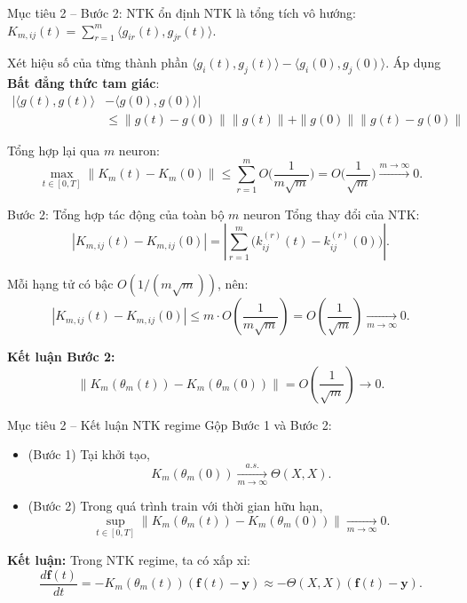 \begin{frame}{Mục tiêu 2 – Bước 2: NTK ổn định}
  NTK là tổng tích vô hướng: $K_{m,ij}(t) = \sum_{r=1}^m \langle g_{ir}(t), g_{jr}(t) \rangle$.

  Xét hiệu số của từng thành phần $\langle g_i(t), g_j(t) \rangle - \langle g_i(0), g_j(0) \rangle$.
  Áp dụng \textbf{Bất đẳng thức tam giác}:
  \[
    \begin{aligned}
      |\langle g(t), g(t) \rangle &- \langle g(0), g(0) \rangle| \\
      &\le \|g(t)-g(0)\|\|g(t)\| + \|g(0)\|\|g(t)-g(0)\|
    \end{aligned}
  \]
  
  Tổng hợp lại qua $m$ neuron:
  \[
    \max_{t \in [0,T]} \|K_m(t) - K_m(0)\| \le \sum_{r=1}^m O\Big(\frac{1}{m\sqrt{m}}\Big) = O\Big(\frac{1}{\sqrt{m}}\Big) \xrightarrow{m \to \infty} 0.
  \]

\end{frame}

\begin{frame}{Bước 2: Tổng hợp tác động của toàn bộ $m$ neuron}
Tổng thay đổi của NTK:
\[
  |K_{m,ij}(t) - K_{m,ij}(0)|
  = \left|\sum_{r=1}^m \big(k_{ij}^{(r)}(t) - k_{ij}^{(r)}(0)\big)\right|.
\]

Mỗi hạng tử có bậc $O(1/(m\sqrt{m}))$, nên:
\[
  |K_{m,ij}(t) - K_{m,ij}(0)|
  \le
  m \cdot O\!\left(\frac{1}{m\sqrt{m}}\right)
  = O\!\left(\frac{1}{\sqrt{m}}\right)
  \xrightarrow[m\to\infty]{}
  0.
\]

\textbf{Kết luận Bước 2:}
\[
  \|K_m(\theta_m(t)) - K_m(\theta_m(0))\|
  = O\!\left(\frac{1}{\sqrt{m}}\right)
  \to 0.
\]
\end{frame}

\begin{frame}{Mục tiêu 2 – Kết luận NTK regime}
  Gộp Bước 1 và Bước 2:
  \begin{itemize}
    \item (Bước 1) Tại khởi tạo,
      \[
        K_m(\theta_m(0)) \xrightarrow[m\to\infty]{a.s.} \Theta(X,X).
      \]
    \item (Bước 2) Trong quá trình train với thời gian hữu hạn,
      \[
        \sup_{t\in[0,T]}
        \|K_m(\theta_m(t)) - K_m(\theta_m(0))\|
        \xrightarrow[m\to\infty]{} 0.
      \]
  \end{itemize}

  \vspace{0.2cm}
  \textbf{Kết luận:} Trong NTK regime, ta có xấp xỉ:
  \[
    \frac{d\mathbf f(t)}{dt}
      = -K_m(\theta_m(t))(\mathbf f(t)-\mathbf y)
      \approx -\Theta(X,X)(\mathbf f(t)-\mathbf y).
  \]
\end{frame}

